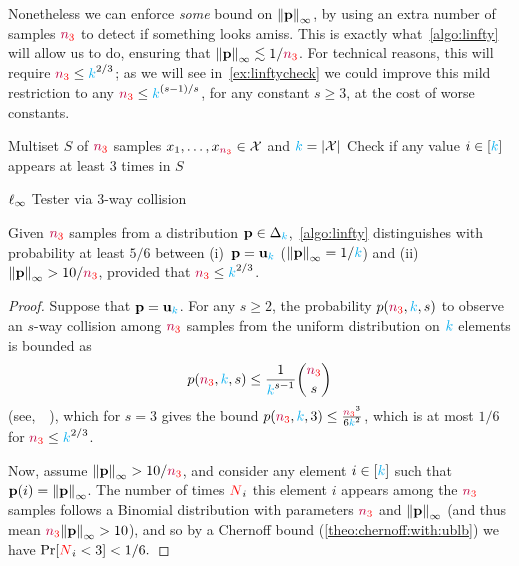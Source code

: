 Nonetheless we can enforce \emph{some} bound on $\norminf{\p}$, by using an extra number of samples $\nsu$ to detect if something looks amiss. This is exactly what~\cref{algo:linfty} will allow us to do, ensuring that $\norminf{\p} \lesssim 1/\nsu$. For technical reasons, this will require $\nsu \leq \ab^{2/3}$; as we will see in~\cref{ex:linftycheck} we could improve this mild restriction to any $\nsu \leq \ab^{(s-1)/s}$, for any constant $s\geq 3$, at the cost of worse constants.
\begin{algorithm}[ht!]
  \begin{algorithmic}[1]
    \Require Multiset $S$ of $\nsu$ samples $x_1,\dots,x_{\nsu}\in \domain$ and $\ab = \abs{\domain}$
    \State Check if any value $i\in[\ab]$ appears at least 3 times in $S$ 
     \Return \reject {}
    \Else\ 
      \Return \accept {}
    \EndIf
  \end{algorithmic}
  \caption{\label{algo:linfty}\sc $\lp[\infty]$ Tester via $3$-way collision}
\end{algorithm}
\begin{lemma}
  \label{lemma:linfty:test}
Given $\nsu$ \iid samples from a distribution $\p\in\distribs{\ab}$,~\cref{algo:linfty} distinguishes with probability at least $5/6$ between (i)~$\p=\uniform_\ab$ (\ie $\norminf{\p}=1/\ab$)  and (ii)~$\norminf{\p} > 10/\nsu$, provided that $\nsu \leq \ab^{2/3}$.
\end{lemma}
\begin{proof}
Suppose that $\p=\uniform_\ab$. For any $s\geq 2$, the probability $p(\nsu,\ab,s)$ to observe an $s$-way collision among $\nsu$ \iid samples from the uniform distribution on $\ab$ elements is bounded as 
\begin{equation}
    p(\nsu,\ab,s) \leq \frac{1}{\ab^{s-1}}\binom{\nsu}{s}
\end{equation}
(see,~\eg~\citet[Theorem~2]{KazuhiroDKK06}), which for $s=3$ gives the bound $p(\nsu,\ab,3) \leq \frac{\nsu^3}{6\ab^{2}}$, which is at most $1/6$ for $\nsu \leq \ab^{2/3}$.

Now, assume $\norminf{\p} > 10/\nsu$, and consider any element $i\in[\ab]$ such that $\p(i)=\norminf{\p}$. The number of times $\occur_{i}$ this element $i$ appears among the $\nsu$ samples follows a Binomial distribution with parameters $\nsu$ and $\norminf{\p}$ (and thus mean $\nsu\norminf{\p} > 10$), and so by a Chernoff bound (\cref{theo:chernoff:with:ublb}) we have
$
    \bPr{ \occur_{i} < 3 } < 1/6. 
$
\end{proof}

